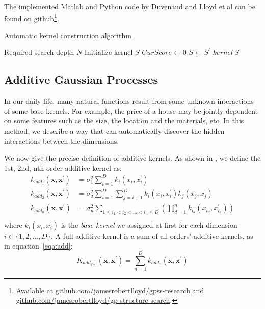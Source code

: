 The implemented Matlab and Python code by Duvenaud and Lloyd et.al can be found on github\footnote{Available at \color{blue}\href{http://github.com/jamesrobertlloyd/gpss-research}{github.com/jamesrobertlloyd/gpss-research} \color{black} and \color{blue}\href{http://github.com/jamesrobertlloyd/gp-structure-search}{github.com/jamesrobertlloyd/gp-structure-search}.}.

\begin{algorithm}[t]
        \caption{Automatic kernel construction algorithm}
        \begin{algorithmic}
        		\Require Required search depth $N$
        		\State Initialize kernel $S$
			\State $CurScore \gets 0$
					\State $S \gets S^{'}$
				\EndIf
			\EndFor
	    	\EndFor
		\State \Return $kernel~S$
       	\end{algorithmic}
\end{algorithm}


\subsection{Additive Gaussian Processes}

In our daily life, many natural functions result from some unknown interactions of some base kernels.
For example, the price of a house may be jointly dependent on some features such as the size, the location and the materials, etc.
In this method, we describe a way that can automatically discover the hidden interactions between the dimensions.


 \label{sec:addGauss}
We now give the precise definition of additive kernels.
As shown in \cite{duvenaud2011additive}, we define the 1st, 2nd, nth order additive kernel as:
\begin{align}
k_{add_{1}} (\textbf{x},\textbf{x}^{'}) &= \sigma^2_1 \sum_{i=1}^{D} k_{i} ({x}_{i},{x}_{i}^{'}) \\
k_{add_{2}} (\textbf{x},\textbf{x}^{'}) &= \sigma^2_2 \sum_{i=1}^{D} \sum_{j=i+1}^{D} k_{i} ({x}_{i},{x}_{i}^{'}) k_{j} ({x}_{j},{x}_{j}^{'}) \\
k_{add_{n}} (\textbf{x},\textbf{x}^{'}) &= \sigma^2_n \sum_{1 \leqslant i_1 < i_2 < ... < i_n \leqslant D} ( \prod_{d=1}^{n} k_{i_d} ({x}_{i_d},{x}_{i_d}^{'}) ) \\
\end{align}
where $k_{i} ({x}_{i},{x}_{i}^{'})$ is the \emph{base kernel} we assigned at first for each dimension $i \in \{1,2,...,D\}$.
A full additive kernel is a sum of all orders' additive kernels, as in equation~\ref{eqa:add}:
\begin{equation} \label{eqa:add}
K_{add_{full}} (\textbf{x},\textbf{x}^{'}) = \sum_{n=1}^{D} k_{add_{n}} (\textbf{x},\textbf{x}^{'})
\end{equation}

